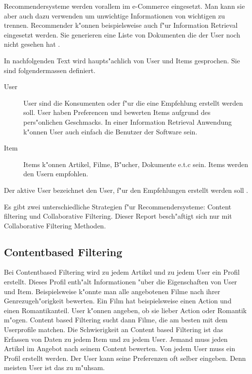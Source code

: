 \documentclass[a4paper, 12pt]{article}
\begin{document}
Recommendersysteme werden vorallem im e-Commerce eingesetzt. Man kann sie aber auch dazu verwenden um unwichtige Informationen von wichtigen zu trennen. Recommender k"onnen beispielsweise auch f"ur Information Retrieval eingesetzt werden. Sie generieren eine Liste von Dokumenten die der User noch nicht gesehen hat \cite{herlocker00}.

In nachfolgenden Text wird haupts"achlich von User und Items gesprochen. Sie sind folgendermassen definiert.

\begin{description}
\item[User] User sind die Konsumenten oder f"ur die eine Empfehlung erstellt werden soll. 
User haben Preferencen und bewerten Items aufgrund des pers"onlichen Geschmacks. In einer Information Retrieval Anwendung k"onnen User auch einfach die Benutzer der Software sein.
\item[Item] 
Items k"onnen Artikel, Filme, B"ucher, Dokumente e.t.c sein. Items werden den Usern empfohlen.
\end{description}

Der aktive User bezeichnet den User, f"ur den Empfehlungen erstellt werden soll \cite{jannach11}.

Es gibt zwei unterschiedliche Strategien f"ur Recommendersysteme: Content filtering und Collaborative Filtering. Dieser Report besch"aftigt sich nur mit Collaborative Filtering Methoden. 

\subsection{Contentbased Filtering}
\label{sec:contentbased}

Bei Contentbased Filtering wird zu jedem Artikel und zu jedem User ein Profil erstellt. Dieses Profil enth"alt Informationen "uber die Eigenschaften von User und Item. Beispielsweise k"onnte man alle angebotenen Filme nach ihrer Genrezugeh"origkeit bewerten. Ein Film hat beispielsweise einen Action und einen Romantikanteil. User k"onnen angeben, ob sie lieber Action oder Romantik m"ogen. Content based Filtering sucht dann Filme, die am besten mit dem Userprofile matchen. Die Schwierigkeit an Content based Filtering ist das Erfassen von Daten zu jedem Item und zu jedem User. Jemand muss jeden Artikel im Angebot nach seinem Content bewerten. Von jedem User muss ein Profil erstellt werden. Der User kann seine Preferenzen oft selber eingeben. Denn meisten User ist das zu m"uhsam.
\end{document}
